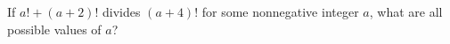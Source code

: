 If $a!+\left(a+2\right)!$ divides $\left(a+4\right)!$ for some nonnegative integer $a$, what are all possible values of $a$?